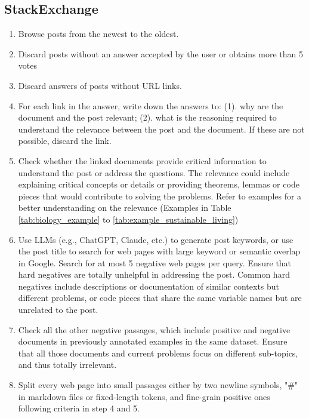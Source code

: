 \subsection{StackExchange}
\begin{enumerate}
  \item Browse posts from the newest to the oldest.
  \item Discard posts without an answer accepted by the user or obtains more than 5 votes
  \item Discard answers of posts without URL links.
  \item For each link in the answer, write down the answers to: (1). why are the document and the post relevant; (2). what is the reasoning required to understand the relevance between the post and the document. If these are not possible, discard the link.
  \item Check whether the linked documents provide critical information to understand the post or address the questions. The relevance could include explaining critical concepts or details or providing theorems, lemmas or code pieces that would contribute to solving the problems. Refer to examples for a better understanding on the relevance (Examples in Table \ref{tab:biology_example} to \ref{tab:example_sustainable_living})
  \item Use LLMs (e.g., ChatGPT, Claude, etc.) to generate post keywords, or use the post title to search for web pages with large keyword or semantic overlap in Google. Search for at most 5 negative web pages per query. Ensure that hard negatives are totally unhelpful in addressing the post. Common hard negatives include descriptions or documentation of similar contexts but different problems, or code pieces that share the same variable names but are unrelated to the post. 
  \item Check all the other negative passages, which include positive and negative documents in previously annotated examples in the same dataset. Ensure that all those documents and current problems focus on different sub-topics, and thus totally irrelevant.
  \item Split every web page into small passages either by two newline symbols, "\#" in markdown files or fixed-length tokens, and fine-grain positive ones following criteria in step 4 and 5.
\end{enumerate}

